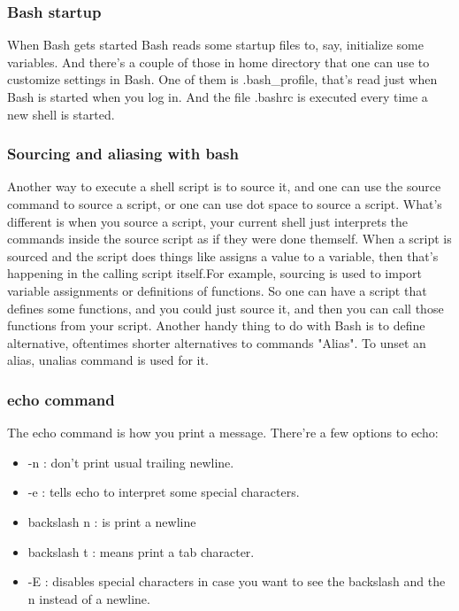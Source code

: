 \subsubsection{Bash startup}
When Bash gets started Bash reads some startup files to, say, initialize some variables. And there's a couple of those in home directory that one can use to customize settings in Bash. One of them is .bash\_profile, that's read just when Bash is started when you log in. And the file .bashrc is executed every time a new shell is started. 

\subsubsection{Sourcing and aliasing with bash}
Another way to execute a shell script is to source it, and one can use the source command to source a script, or one can use dot space to source a script. What's different is when you source a script, your current shell just interprets the commands inside the source script as if they were done themself. When a script is sourced and the script does things like assigns a value to a variable, then that's happening in the calling script itself.For example, sourcing is used to import variable assignments or definitions of functions. So one can have a script that defines some functions, and you could just source it, and then you can call those functions from your script. Another handy thing to do with Bash is to define alternative, oftentimes shorter alternatives to commands "Alias". To unset an alias, unalias command is used for it. 

\subsubsection{echo command}
The echo command is how you print a message. There're a few options to echo: 
\begin{itemize}
    \item  -n : don't print usual trailing newline. 
    \item  -e : tells echo to interpret some special characters.
    \item  backslash n : is print a newline
    \item  backslash t : means print a tab character. 
    \item  -E : disables special characters in case you want to see the backslash and the n instead of a newline. 
\end{itemize}    
    
